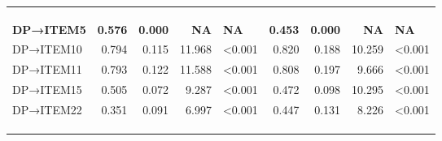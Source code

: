 \documentclass[
]{article}
\begin{document}
\begin{table}
\begin{tabular}[t]{lrrrlrrrl}
\cellcolor[HTML]{E5E4E2}{EE→ITEM14} & \cellcolor[HTML]{E5E4E2}{0.655} & \cellcolor[HTML]{E5E4E2}{0.046} & \cellcolor[HTML]{E5E4E2}{19.939} & \cellcolor[HTML]{E5E4E2}{<0.001} & \cellcolor[HTML]{E5E4E2}{0.634} & \cellcolor[HTML]{E5E4E2}{0.045} & \cellcolor[HTML]{E5E4E2}{20.685} & \cellcolor[HTML]{E5E4E2}{<0.001}\\
\cellcolor[HTML]{E5E4E2}{EE→ITEM16} & \cellcolor[HTML]{E5E4E2}{0.640} & \cellcolor[HTML]{E5E4E2}{0.047} & \cellcolor[HTML]{E5E4E2}{15.992} & \cellcolor[HTML]{E5E4E2}{<0.001} & \cellcolor[HTML]{E5E4E2}{0.596} & \cellcolor[HTML]{E5E4E2}{0.047} & \cellcolor[HTML]{E5E4E2}{15.261} & \cellcolor[HTML]{E5E4E2}{<0.001}\\
\cellcolor[HTML]{E5E4E2}{EE→ITEM20} & \cellcolor[HTML]{E5E4E2}{0.734} & \cellcolor[HTML]{E5E4E2}{0.045} & \cellcolor[HTML]{E5E4E2}{18.371} & \cellcolor[HTML]{E5E4E2}{<0.001} & \cellcolor[HTML]{E5E4E2}{0.707} & \cellcolor[HTML]{E5E4E2}{0.048} & \cellcolor[HTML]{E5E4E2}{17.421} & \cellcolor[HTML]{E5E4E2}{<0.001}\\
\textbf{DP→ITEM5} & \textbf{0.576} & \textbf{0.000} & \textbf{NA} & \textbf{NA} & \textbf{0.453} & \textbf{0.000} & \textbf{NA} & \textbf{NA}\\
DP→ITEM10 & 0.794 & 0.115 & 11.968 & <0.001 & 0.820 & 0.188 & 10.259 & <0.001\\
DP→ITEM11 & 0.793 & 0.122 & 11.588 & <0.001 & 0.808 & 0.197 & 9.666 & <0.001\\
DP→ITEM15 & 0.505 & 0.072 & 9.287 & <0.001 & 0.472 & 0.098 & 10.295 & <0.001\\
DP→ITEM22 & 0.351 & 0.091 & 6.997 & <0.001 & 0.447 & 0.131 & 8.226 & <0.001\\
\textbf{\cellcolor[HTML]{E5E4E2}{PA→ITEM4}} & \textbf{\cellcolor[HTML]{E5E4E2}{0.447}} & \textbf{\cellcolor[HTML]{E5E4E2}{0.000}} & \textbf{\cellcolor[HTML]{E5E4E2}{NA}} & \textbf{\cellcolor[HTML]{E5E4E2}{NA}} & \textbf{\cellcolor[HTML]{E5E4E2}{0.340}} & \textbf{\cellcolor[HTML]{E5E4E2}{0.000}} & \textbf{\cellcolor[HTML]{E5E4E2}{NA}} & \textbf{\cellcolor[HTML]{E5E4E2}{NA}}\\
\cellcolor[HTML]{E5E4E2}{PA→ITEM7} & \cellcolor[HTML]{E5E4E2}{0.516} & \cellcolor[HTML]{E5E4E2}{0.148} & \cellcolor[HTML]{E5E4E2}{7.308} & \cellcolor[HTML]{E5E4E2}{<0.001} & \cellcolor[HTML]{E5E4E2}{0.545} & \cellcolor[HTML]{E5E4E2}{0.221} & \cellcolor[HTML]{E5E4E2}{7.495} & \cellcolor[HTML]{E5E4E2}{<0.001}\\
\cellcolor[HTML]{E5E4E2}{PA→ITEM9} & \cellcolor[HTML]{E5E4E2}{0.581} & \cellcolor[HTML]{E5E4E2}{0.280} & \cellcolor[HTML]{E5E4E2}{6.629} & \cellcolor[HTML]{E5E4E2}{<0.001} & \cellcolor[HTML]{E5E4E2}{0.681} & \cellcolor[HTML]{E5E4E2}{0.365} & \cellcolor[HTML]{E5E4E2}{7.432} & \cellcolor[HTML]{E5E4E2}{<0.001}\\

\end{tabular}
\end{table}
\end{document}
